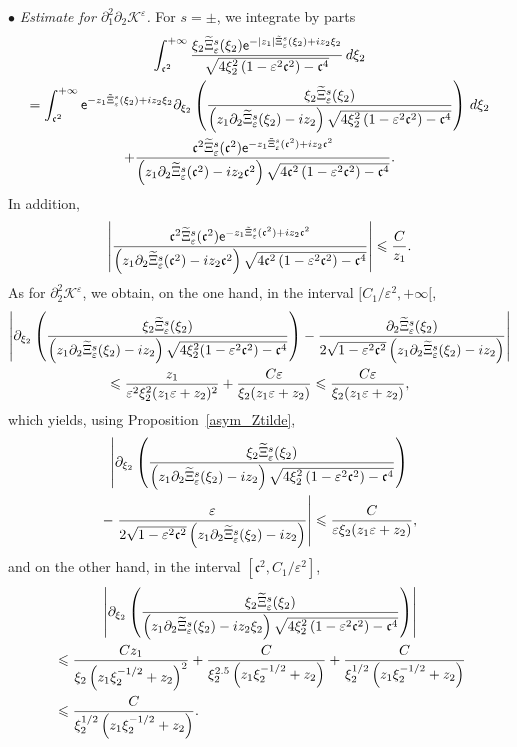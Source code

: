 \documentclass[AHL,Unicode,longabstracts,published]{cedram}
\newcommand*\p{\partial}
\newcommand*\BK{\mathcal{K}}
\newcommand*\ex{{\sf e}}
\newcommand*\cs{{\mathfrak c}}
\newcommand*\ii{\infty}
\newcommand*\ls{\leqslant }
\newcommand*\e{\varepsilon}
\renewcommand*\t{\tilde}
\let\oldtilde\tilde
\renewcommand*{\tilde}[1]{\mathchoice{\widetilde{#1}}{\widetilde{#1}}{\oldtilde{#1}}{\oldtilde{#1}}}
\begin{document}
\noindent $ \bullet $ \emph{Estimate for $ \p_1^2 \p_2 \BK^\e $.} For $ s = \pm $, we integrate by parts
\begin{multline}\label{IPP_K112_zero}
\int_{ \cs^2}^{+\ii} \frac{ \xi_2 \t\Xi_\e^s (\xi_2) \ex^{- |z_1| \t\Xi_\e^s (\xi_2) + i z_2 \xi_2} }{
\sqrt{ 4 \xi_2^2 \left(1 - \e^2 \cs^2\right) - \cs^4 } } \, d\xi_2
\\
 =
\int_{ \cs^2}^{+\ii} \ex^{- z_1 \t\Xi_\e^s (\xi_2) + i z_2 \xi_2 }
\p_{\xi_2} \left(\frac{ \xi_2 \t\Xi_\e^s (\xi_2) }{ \left(z_1 \p_2 \t\Xi_\e^s (\xi_2) - i z_2\right) \sqrt{ 4 \xi_2^2 \left(1 - \e^2 \cs^2\right) - \cs^4 } } \right) \, d\xi_2\\
+ \frac{ \cs^2 \t\Xi_\e^s (\cs^2) \ex^{- z_1 \t\Xi_\e^s (\cs^2) + i z_2 \cs^2 } }{\left(z_1 \p_2 \t\Xi_\e^s (\cs^2) - i z_2 \cs^2\right) \sqrt{ 4 \cs^2 \left(1 - \e^2 \cs^2\right) - \cs^4 } }.
\end{multline}
In addition,
\begin{align*}
\left\lvert
\frac{ \cs^2 \t\Xi_\e^s (\cs^2) \ex^{- z_1 \t\Xi_\e^s (\cs^2) + i z_2 \cs^2} }{\left(z_1 \p_2 \t\Xi_\e^s (\cs^2) - i z_2 \cs^2\right)
\sqrt{ 4 \cs^2\left(1 - \e^2 \cs^2\right) - \cs^4 } } \right\rvert
\ls \frac{C}{z_1 }.
\end{align*}
As for $ \p_2^2 \BK^\e $, we obtain, on the one hand, in the interval $ [C_1 / \e^{2}, +\ii [$,
\begin{multline*}
\left\lvert \p_{\xi_2} \left(\frac{ \xi_2 \t\Xi_\e^s (\xi_2) }{\left(z_1 \p_2 \t\Xi_\e^s (\xi_2) - i z_2\right) \sqrt{ 4 \xi_2^2 (1 - \e^2 \cs^2) - \cs^4 } } \right) - \frac{ \p_2 \t\Xi_\e^s (\xi_2) }{ 2 \sqrt{ 1 - \e^2 \cs^2 } \left(z_1 \p_2 \t\Xi_\e^s (\xi_2) - i z_2\right) }
\right\rvert
\\
\ls \frac{ z_1 }{ \e^2 \xi_2^2 (z_1 \e + z_2)^2 } + \frac{ C \e }{ \xi_2 (z_1 \e + z_2) }
\ls \frac{ C \e }{ \xi_2 (z_1 \e + z_2) },
\end{multline*}
which yields, using Proposition~\ref{asym_Ztilde},
\begin{multline}\label{IPPrevient}
\left\lvert \p_{\xi_2} \left(\frac{ \xi_2 \t\Xi_\e^s (\xi_2) }{\left(z_1 \p_2 \t\Xi_\e^s (\xi_2) - i z_2\right) \sqrt{ 4 \xi_2^2 \left(1 - \e^2 \cs^2\right) - \cs^4 } } \right)\right.\\ 
-\left. \frac{ \e }{ 2 \sqrt{ 1 - \e^2 \cs^2 } \left(z_1 \p_2 \t\Xi_\e^s (\xi_2) - i z_2\right) }
\right\rvert
\ls \frac{ C }{ \e \xi_2 (z_1 \e + z_2) },
\end{multline}
and on the other hand, in the interval $ [\cs^2, C_1 / \e^{2}] $,
\begin{multline*}
\left\lvert \p_{\xi_2} \left(\frac{ \xi_2 \t\Xi_\e^s (\xi_2) }{\left(z_1 \p_2 \t\Xi_\e^s (\xi_2) - i z_2 \xi_2\right) \sqrt{ 4 \xi_2^2\left(1 - \e^2 \cs^2\right) - \cs^4}} \right)\right\rvert
\\
\begin{aligned}
&\ls \frac{ C z_1 }{ \xi_2 \left(z_1 \xi_2^{-1/2} + z_2\right)^2 } + \frac{ C }{ \xi_2^{2.5} \left(z_1 \xi_2^{-1/2} + z_2\right) } + \frac{ C }{ \xi_2^{1/2} \left(z_1 \xi_2^{-1/2} + z_2\right) }\\
&\ls \frac{ C }{ \xi_2^{1/2}\left(z_1 \xi_2^{-1/2} + z_2\right) }.
\end{aligned}
\end{multline*}
\end{document}
